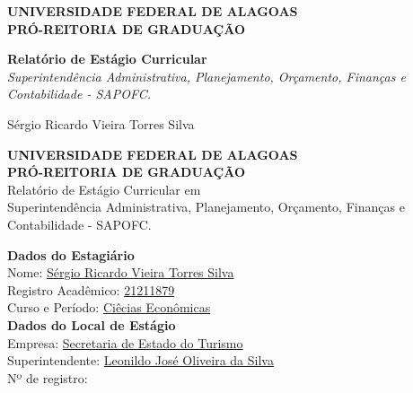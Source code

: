 \documentclass[12pt,a4paper]{article}
\begin{document}
	
	\begin{titlepage}
		\centering
		\large
		\textbf{UNIVERSIDADE FEDERAL DE ALAGOAS} \\
		\textbf{PRÓ-REITORIA DE GRADUAÇÃO} \\
		\vfill
		
		\Huge \textbf{Relatório de Estágio Curricular} \\
		\vspace{0.5cm}
		\LARGE \textit{Superintendência Administrativa, Planejamento, Orçamento, Finanças e Contabilidade - SAPOFC.} \\
		\vfill
		
		\Large Sérgio Ricardo Vieira Torres Silva \\
		\vspace{1.5cm}
	\end{titlepage}
	
	\thispagestyle{empty}
	\begin{center}
		\textbf{UNIVERSIDADE FEDERAL DE ALAGOAS} \\
		\textbf{PRÓ-REITORIA DE GRADUAÇÃO}\\
		\vspace{1cm}
		{Relatório de Estágio Curricular em}\\
		{Superintendência Administrativa, Planejamento, Orçamento, Finanças e Contabilidade - SAPOFC.}
	\end{center}
	
	\vspace{1cm}
	
	\noindent \textbf{Dados do Estagiário} \\
	Nome: \underline{Sérgio Ricardo Vieira Torres Silva\hspace{0,2cm}} \\
	Registro Acadêmico: \underline{21211879\hspace{0,2cm}} \\
	Curso e Período: \underline{Ciêcias Econômicas\hspace{0,2cm}} \\
	
	\vspace{0.5cm}
	\noindent \textbf{Dados do Local de Estágio} \\
	Empresa: \underline{Secretaria de Estado do Turismo\hspace{0,2cm}} \\
	Superintendente: \underline{Leonildo José Oliveira da Silva\hspace{0,2cm}} \\
	Nº de registro: \underline{\hspace{0,2cm}} \\
	
\end{document}
